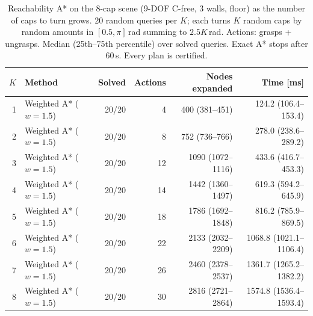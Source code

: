 \begin{table}[t]
\centering
\caption{Reachability A* on the 8-cap scene (9-DOF C-free, 3 walls, floor) as the number of caps to
turn grows. 20 random queries per $K$; each turns $K$ random caps by random amounts in
$[0.5,\pi]$\,rad summing to $2.5K$\,rad. Actions: grasps + ungrasps. Median (25th--75th
percentile) over solved queries. Exact A* stops after 60\,s. Every plan is certified.}
\label{tab:cap_scaling}
\setlength{\tabcolsep}{3.5pt}
\begin{tabular}{@{}r l r r r r@{}}
\toprule
$K$ & Method & Solved & Actions & Nodes expanded & Time [ms]\\
\midrule
\multirow{1}{*}{1} & Weighted A* ($w=1.5$) & 20/20 & 4 & 400 (381--451) & 124.2 (106.4--153.4)\\
\midrule
\multirow{1}{*}{2} & Weighted A* ($w=1.5$) & 20/20 & 8 & 752 (736--766) & 278.0 (238.6--289.2)\\
\midrule
\multirow{1}{*}{3} & Weighted A* ($w=1.5$) & 20/20 & 12 & 1090 (1072--1116) & 433.6 (416.7--453.3)\\
\midrule
\multirow{1}{*}{4} & Weighted A* ($w=1.5$) & 20/20 & 14 & 1442 (1360--1497) & 619.3 (594.2--645.9)\\
\midrule
\multirow{1}{*}{5} & Weighted A* ($w=1.5$) & 20/20 & 18 & 1786 (1692--1848) & 816.2 (785.9--869.5)\\
\midrule
\multirow{1}{*}{6} & Weighted A* ($w=1.5$) & 20/20 & 22 & 2133 (2032--2209) & 1068.8 (1021.1--1106.4)\\
\midrule
\multirow{1}{*}{7} & Weighted A* ($w=1.5$) & 20/20 & 26 & 2460 (2378--2537) & 1361.7 (1265.2--1382.2)\\
\midrule
\multirow{1}{*}{8} & Weighted A* ($w=1.5$) & 20/20 & 30 & 2816 (2721--2864) & 1574.8 (1536.4--1593.4)\\
\bottomrule
\end{tabular}
\end{table}
